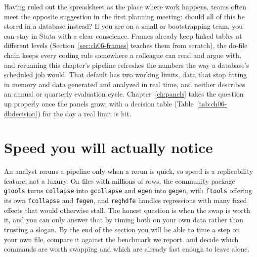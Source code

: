 Having ruled out the spreadsheet as the place where work happens, teams often meet the opposite suggestion in the first planning meeting: should all of this be stored in a database instead? If you are on a small or bootstrapping team, you can stay in Stata with a clear conscience. Frames already keep linked tables at different levels (Section~\ref{sec:ch06-frames} teaches them from scratch), the do-file chain keeps every coding rule somewhere a colleague can read and argue with, and rerunning this chapter's pipeline refreshes the numbers the way a database's scheduled job would. That default has two working limits, data that stop fitting in memory and data generated and analyzed in real time, and neither describes an annual or quarterly evaluation cycle. Chapter~\ref{ch:panels} takes the question up properly once the panels grow, with a decision table (Table~\ref{tab:ch06-dbdecision}) for the day a real limit is hit.

\section{Speed you will actually notice}\label{sec:speed}
An analyst reruns a pipeline only when a rerun is quick, so speed is a replicability feature, not a luxury. On files with millions of rows, the community package \texttt{gtools} turns \texttt{collapse} into \texttt{gcollapse} and \texttt{egen} into \texttt{gegen}, with \texttt{ftools} offering its own \texttt{fcollapse} and \texttt{fegen}, and \texttt{reghdfe} handles regressions with many fixed effects that would otherwise stall. The honest question is when the swap is worth it, and you can only answer that by timing both on your own data rather than trusting a slogan. By the end of the section you will be able to time a step on your own file, compare it against the benchmark we report, and decide which commands are worth swapping and which are already fast enough to leave alone.

